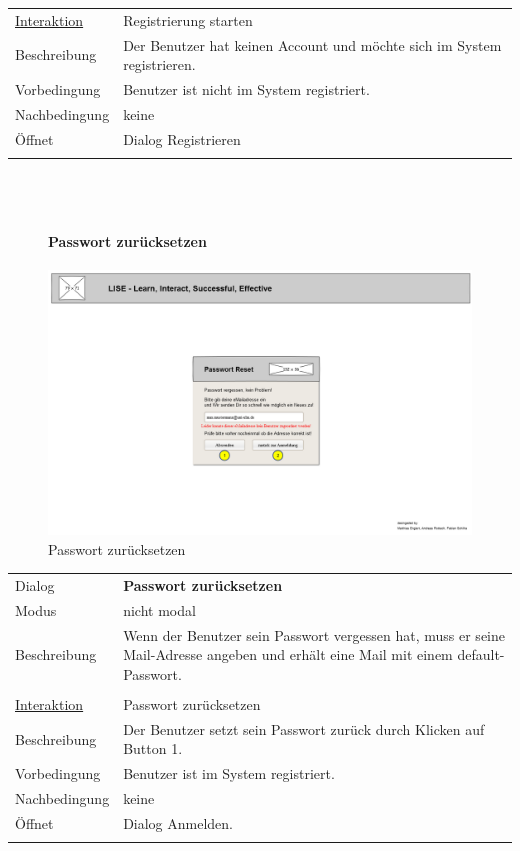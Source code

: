 \documentclass[12pt,a4paper]{article}
\begin{document}
{\begin{tabular}{l p{12cm}}
	\underline{Interaktion} 	 & Registrierung starten\\ 
	Beschreibung   	& Der Benutzer hat keinen Account und möchte sich im System registrieren.\\
	Vorbedingung	& Benutzer ist nicht im System registriert.\\
	Nachbedingung	& keine \\
	Öffnet			& Dialog \glqq Registrieren\grqq\\\\
\end{tabular}\\\\

\begin{figure}[H]
	\centering
	\paragraph{Passwort zurücksetzen}
	\includegraphics[width=\textwidth]{Bilder/Mockups/GUI/PasswortVergessen.png}
	\caption{Passwort zurücksetzen}
	\label{GuiPasswortVergessen}
\end{figure}
\begin{tabular}{l p{12cm}}
	Dialog 	 & \textbf{Passwort zurücksetzen} \\ 
	Modus & nicht modal\\ 
	Beschreibung   	& Wenn der Benutzer sein Passwort vergessen hat, muss er seine Mail-Adresse angeben und erhält eine Mail mit einem default-Passwort. \\\\
	
	\underline{Interaktion} 	 & Passwort zurücksetzen\\ 
	Beschreibung   	& Der Benutzer setzt sein Passwort zurück durch Klicken auf Button 1.\\
	Vorbedingung	& Benutzer ist im System registriert.\\
	Nachbedingung	& keine \\
	Öffnet			& Dialog \glqq Anmelden\grqq.\\\\
\end{tabular}

}
\end{document}
